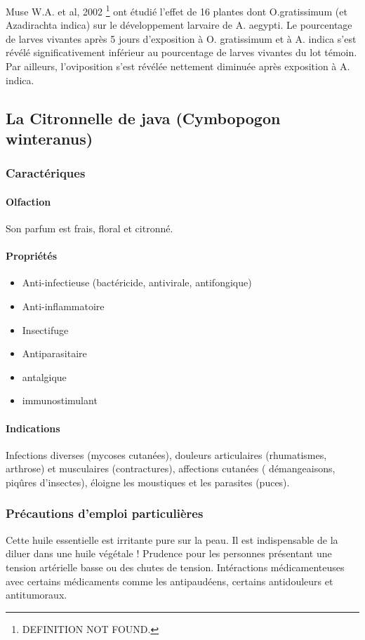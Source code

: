 \documentclass[12pt,a4wide]{article}
\begin{document}
Muse W.A. et al,  2002 \footnote{DEFINITION NOT FOUND.} ont étudié l'effet de  16 plantes dont O.gratissimum
(et  Azadirachta  indica)  sur  le  développement larvaire  de  A.  aegypti.  Le
pourcentage de larves vivantes après 5  jours d'exposition à O. gratissimum et à
A.  indica s'est  révélé significativement  inférieur au  pourcentage de  larves
vivantes  du lot  témoin. Par  ailleurs, l'oviposition  s'est révélée  nettement
diminuée après exposition à A. indica.





\subsection{La Citronnelle de java (Cymbopogon winteranus)}
\label{sec-4-4}
\subsubsection{Caractériques}
\label{sec-4-4-1}
\paragraph{Olfaction}
\label{sec-4-4-1-1}
Son parfum est frais, floral et citronné.
\paragraph{Propriétés}
\label{sec-4-4-1-2}
\begin{itemize}
\item Anti-infectieuse (bactéricide, antivirale, antifongique)
\item Anti-inflammatoire
\item Insectifuge
\item Antiparasitaire
\item antalgique
\item immunostimulant
\end{itemize}

\paragraph{Indications}
\label{sec-4-4-1-3}
Infections diverses (mycoses cutanées), douleurs articulaires (rhumatismes, arthrose) et musculaires (contractures), affections cutanées ( démangeaisons, piqûres d'insectes), éloigne les moustiques et les parasites (puces).

\subsubsection{Précautions d'emploi particulières}
\label{sec-4-4-2}
Cette huile essentielle est irritante pure sur la peau. Il est indispensable de la diluer dans une huile végétale !
Prudence pour les personnes présentant une tension artérielle basse ou des chutes de tension.
Intéractions médicamenteuses avec certains médicaments comme les antipaudéens, certains antidouleurs et antitumoraux.
\end{document}
